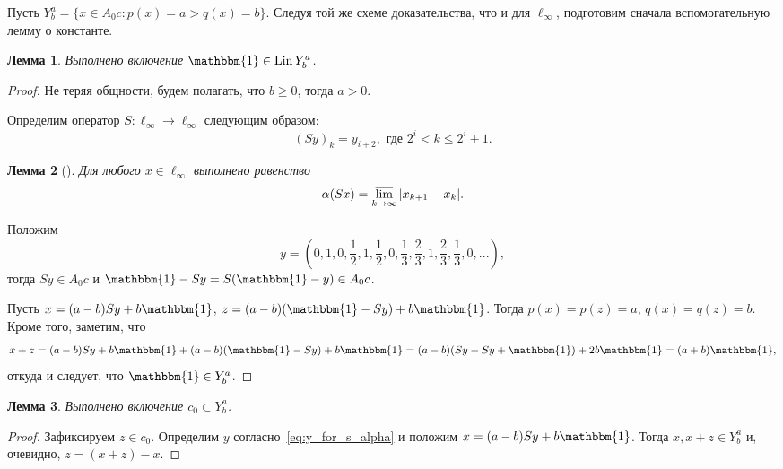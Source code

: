 \documentclass[a4paper,14pt]{article} %
\theoremstyle{plain}
\newtheorem{lemma}{Лемма}[section]
\begin{document}
Пусть $Y^a_b = \{x\in A_0 c : p(x) = a > q(x) = b\}$.
Следуя той же схеме доказательства, что и для $\ell_\infty$,
подготовим сначала вспомогательную лемму о константе.

\begin{lemma}
	\label{lem:const_Lin_alpha_0}
	Выполнено включение
	$\mathbbm{1}\in \operatorname{Lin} Y^a_b$.
\end{lemma}

\begin{proof}
	Не теряя общности, будем полагать, что $b\geq 0$, тогда $a>0$.

	Определим оператор $S:\ell_\infty \to \ell_\infty$ следующим образом:
	\begin{equation}\label{operator_S}
		(Sy)_k = y_{i+2}, \mbox{ где } 2^i < k \leq 2^i+1
		.
	\end{equation}
	\begin{lemma}[{\cite{our-vzms-2018}}]
		Для любого $x\in \ell_\infty$ выполнено равенство
		\begin{equation}\label{alpha_S}
			\alpha(Sx) = \varlimsup_{k\to\infty} |x_{k+1} - x_{k}|
			.
		\end{equation}
	\end{lemma}
	Положим
	\begin{equation}
		\label{eq:y_for_s_alpha}
		y = \left(0,1,0,\frac{1}{2},1,\frac{1}{2},0,\frac{1}{3},\frac{2}{3},1,\frac{2}{3},\frac{1}{3},0,...\right)
		,
	\end{equation}
	тогда $Sy\in A_0 c$ и $\mathbbm{1}-Sy = S(\mathbbm{1}-y)\in A_0 c$.

	Пусть $x=(a-b)Sy+b\mathbbm{1}$, $z=(a-b)(\mathbbm{1}-Sy)+b\mathbbm{1}$.
	Тогда $p(x)=p(z)=a$, $q(x)=q(z)=b$.
	Кроме того, заметим, что
	\begin{equation}
		x+z = (a-b)Sy+b\mathbbm{1} + (a-b)(\mathbbm{1}-Sy)+b\mathbbm{1}
		=
		(a-b)(Sy-Sy+\mathbbm{1}) + 2 b\mathbbm{1} = (a+b)\mathbbm{1}
		,
	\end{equation}
	откуда и следует, что $\mathbbm{1}\in Y^a_b$.
\end{proof}

\begin{lemma}
	\label{lem:c_0_Lin_alpha_0}
	Выполнено включение $c_0 \subset Y^a_b$.
\end{lemma}

\begin{proof}
	Зафиксируем $z\in c_0$.
	Определим $y$ согласно~\eqref{eq:y_for_s_alpha} и положим
	$x=(a-b)Sy+b\mathbbm{1}$.
	Тогда $x, x+z\in Y^a_b$ и, очевидно, $z=(x+z)-x$.
\end{proof}
\end{document}
